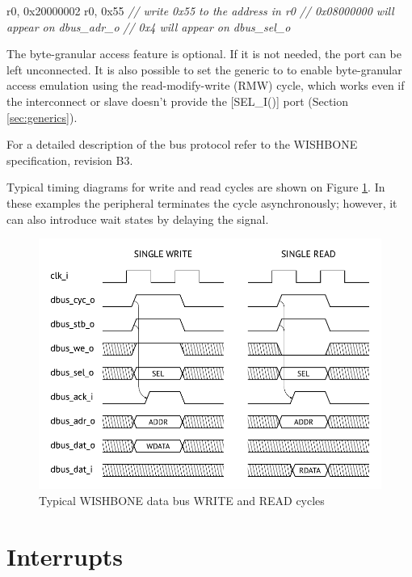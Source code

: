 \documentclass[a4paper,12pt,twoside,extrafontsizes]{memoir}
\begin{document}
\begin{codeparbreakable}
     r0, 0x20000002
     r0, 0x55
\emph{// write 0x55 to the address in r0}
\emph{// 0x08000000 will appear on dbus_adr_o}
\emph{// 0x4 will appear on dbus_sel_o}
\end{codeparbreakable}

The byte-granular access feature is optional. If it is not needed, the  port can be left unconnected. It is also possible to set the  generic to  to enable byte-granular access emulation using the read-modify-write (RMW) cycle, which works even if the interconnect or slave doesn't provide the [SEL\_I()] port (Section \ref{sec:generics}).

For a detailed description of the bus protocol refer to the WISHBONE specification, revision B3.

Typical timing diagrams for write and read cycles are shown on Figure \ref{fig:dbustiming}. In these examples the peripheral terminates the cycle asynchronously; however, it can also introduce wait states by delaying the  signal.

\begin{figure}[htbp]
	\centering
	\includegraphics[scale=0.928]{images/dbustiming.pdf}
	\caption{Typical WISHBONE data bus WRITE and READ cycles}
	\label{fig:dbustiming}
\end{figure}

\section{Interrupts}
\end{document}

